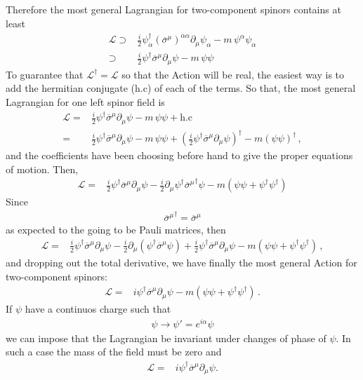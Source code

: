 \begin{frame}
Therefore  the most general Lagrangian for two-component spinors contains at least
\begin{align}
    \mathcal{L}\supset&\frac{i}{2}{\psi}^{\dagger}_{\dot{\alpha}}\left(\overline{\sigma}^{\mu}\right)^{\dot{\alpha}\alpha}\partial_\mu\psi_{\alpha}-m\,\psi^{\alpha}\psi_{\alpha} \nonumber\\
\supset&\frac{i}{2}{\psi}^{\dagger}\overline{\sigma}^\mu\partial_\mu\psi-m\,\psi\psi
\end{align}
To guarantee that $\mathcal{L}^{\dagger}=\mathcal{L}$ so that the Action will be real, the easiest way is to add the hermitian conjugate (h.c) of each of the terms. So that, the most general Lagrangian for one left spinor field is
\begin{align*}
  \mathcal{L}=&\frac{i}{2}{\psi}^{\dagger}\overline{\sigma}^\mu\partial_\mu\psi-m\,\psi\psi+
\text{h.c} \nonumber\\
=&\frac{i}{2}{\psi}^{\dagger}\overline{\sigma}^\mu\partial_\mu\psi-m\,\psi\psi+
\left(\frac{i}{2} {\psi}^{\dagger}\overline{\sigma}^\mu\partial_\mu\psi \right)^{\dagger}-m \left(\psi\psi  \right)^{\dagger}\,,
\end{align*}
and the coefficients have been choosing before hand to give the proper equations of motion. Then,
\begin{align*}
  \mathcal{L}=&\frac{i}{2}{\psi}^{\dagger}\overline{\sigma}^\mu\partial_\mu\psi-\frac{i}{2} \partial_\mu\psi^{\dagger}{\overline{\sigma}^\mu}^{\dagger}\psi-m \left( \psi\psi+\psi^{\dagger}\psi^{\dagger} \right)
\end{align*}
Since
\begin{align}
{\overline{\sigma}^\mu}^{\dagger}=\overline{\sigma}^\mu
\end{align}
as expected to the going to be Pauli matrices, then
\begin{align}
\mathcal{L}=&\frac{i}{2}{\psi}^{\dagger}\overline{\sigma}^\mu\partial_\mu\psi-\frac{i}{2} \partial_\mu \left(  \psi^{\dagger} \overline{\sigma}^\mu\psi\right)
+\frac{i}{2}{\psi}^{\dagger}\overline{\sigma}^\mu\partial_\mu\psi
-m \left( \psi\psi+\psi^{\dagger}\psi^{\dagger} \right)\,,
\end{align}
and dropping out the total derivative, we have finally the most general Action for two-component spinors:
\begin{align}
  \mathcal{L}=&i{\psi}^{\dagger}\overline{\sigma}^\mu\partial_\mu\psi-
m \left( \psi\psi+\psi^{\dagger}\psi^{\dagger} \right)\,.
\end{align}
If $\psi$ have a continuos charge such that
\begin{align}
  \psi\to\psi'=e^{i\alpha}\psi
\end{align}
we can impose that the Lagrangian be invariant under changes of phase of $\psi$. In such a case the mass of the field must be zero and
\begin{align}
   \mathcal{L}=&i{\psi}^{\dagger}\overline{\sigma}^\mu\partial_\mu\psi.
\end{align}


\end{frame}
